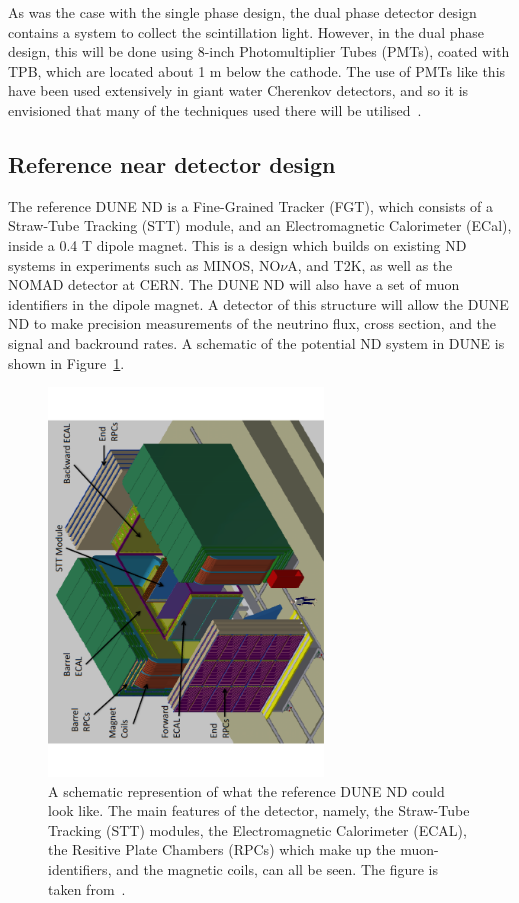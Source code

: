 As was the case with the single phase design, the dual phase detector design contains a system to collect the scintillation light. However, in the dual phase design, this will be done using 8-inch Photomultiplier Tubes (PMTs), coated with TPB, which are located about 1 m below the cathode. The use of PMTs like this have been used extensively in giant water Cherenkov detectors, and so it is envisioned that many of the techniques used there will be utilised~\citep{1748-0221-6-01-C01081, Genolini:2008uc}. \\ 

\subsection{Reference near detector design} \label{sec:DUNEDetector_Near}
The reference DUNE ND is a Fine-Grained Tracker (FGT), which consists of a Straw-Tube Tracking (STT) module, and an Electromagnetic Calorimeter (ECal), inside a 0.4 T dipole magnet. This is a design which builds on existing ND systems in experiments such as MINOS, NO$\nu$A, and T2K, as well as the NOMAD detector at CERN. The DUNE ND will also have a set of muon identifiers in the dipole magnet. A detector of this structure will allow the DUNE ND to make precision measurements of the neutrino flux, cross section, and the signal and backround rates. A schematic of the potential ND system in DUNE is shown in Figure~\ref{fig:DUNE_Near_Schem}. \\

\begin{figure}
  \centering
  \includegraphics[width=0.65\textwidth]{STT_Schematic}
  \caption[A schematic represention of what the reference DUNE ND could look like]
          {A schematic represention of what the reference DUNE ND could look like. The main features of the detector, namely, the Straw-Tube Tracking (STT) modules, the Electromagnetic Calorimeter (ECAL), the Resitive Plate Chambers (RPCs) which make up the muon-identifiers, and the magnetic coils, can all be seen. The figure is taken from~\citep{DUNECDR_V4}.}
  \label{fig:DUNE_Near_Schem}
\end{figure}

